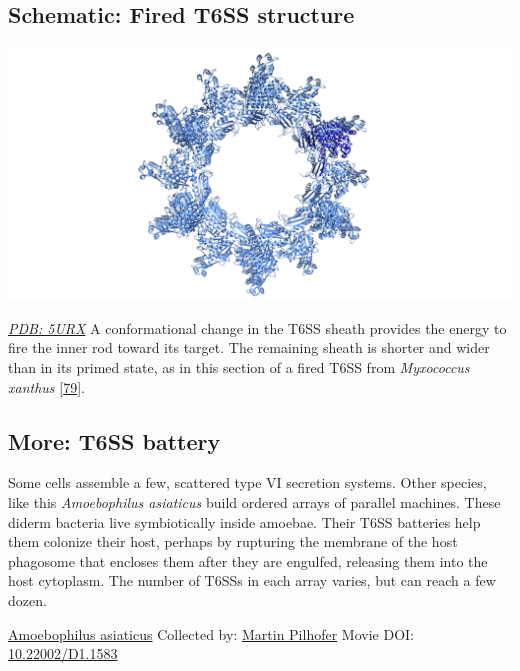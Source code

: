 \documentclass[]{tufte-book}
\begin{document}
\hypertarget{Fired_T6SS_structure}{%
\subsection*{Schematic: Fired T6SS structure}\label{Fired_T6SS_structure}}

\includegraphics{img/schematics/9_7_1}

\href{http://rcsb.org/structure/5URX}{\emph{PDB: 5URX}}
A conformational change in the T6SS sheath provides the energy to fire the inner rod toward its target. The remaining sheath is shorter and wider than in its primed state, as in this section of a fired T6SS from \emph{Myxococcus xanthus} {[}\protect\hyperlink{ref-chang2017}{79}{]}.

\hypertarget{T6SS_battery}{%
\subsection*{More: T6SS battery}\label{T6SS_battery}}

Some cells assemble a few, scattered type VI secretion systems. Other species, like this \emph{Amoebophilus asiaticus} build ordered arrays of parallel machines. These diderm bacteria live symbiotically inside amoebae. Their T6SS batteries help them colonize their host, perhaps by rupturing the membrane of the host phagosome that encloses them after they are engulfed, releasing them into the host cytoplasm. The number of T6SSs in each array varies, but can reach a few dozen.



\hypertarget{htmlwidget-ac4274de4ccbcb08241d}{}

\label{fig:9-7a}\protect\hyperlink{tree}{Amoebophilus asiaticus} Collected by: \protect\hyperlink{martin_pilhofer}{Martin Pilhofer} Movie DOI: \href{https://doi.org/10.22002/D1.1583}{10.22002/D1.1583}
\end{document}

